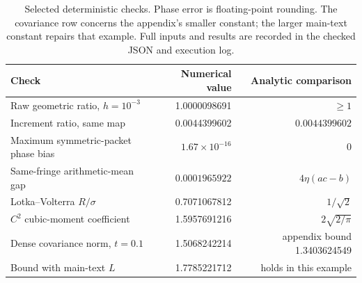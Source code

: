 \begin{table}[tbp]
\centering\small
\begin{tabular}{p{.46\linewidth}rr}
\toprule
Check & Numerical value & Analytic comparison\\
\midrule
Raw geometric ratio, $h=10^{-3}$ & 1.0000098691 & $\geq1$\\
Increment ratio, same map & 0.0044399602 & $0.0044399602$\\
Maximum symmetric-packet phase bias & $1.67\times10^{-16}$ & $0$\\
Same-fringe arithmetic-mean gap & $0.0001965922$ & $4\eta(ac-b)$\\
Lotka--Volterra $R/\sigma$ & 0.7071067812 & $1/\sqrt2$\\
$C^2$ cubic-moment coefficient & 1.5957691216 & $2\sqrt{2/\pi}$\\
Dense covariance norm, $t=0.1$ & 1.5068242214 & appendix bound 1.3403624549\\
Bound with main-text $L$ & 1.7785221712 & holds in this example\\
\bottomrule
\end{tabular}
\caption{Selected deterministic checks. Phase error is floating-point rounding.
The covariance row concerns the appendix's smaller constant; the larger
main-text constant repairs that example. Full inputs and results are recorded
in the checked JSON and execution log.}
\label{tab:checks}
\end{table}

